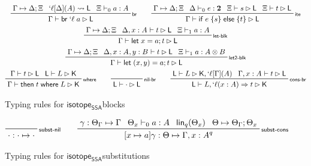 \documentclass[acmsmall,screen,review]{acmart}
\newcommand{\mb}[1]{\ensuremath{\mathbf{#1}}}
\newcommand{\ms}[1]{\ensuremath{\mathsf{#1}}}
\newcommand{\lbl}[1]{{`#1}}
\newcommand{\lto}{\Rightarrow}
\newcommand{\letstmt}[3]{\ensuremath{\ms{let}\;#1 = #2; #3}}
\newcommand{\brb}[2]{\ms{br}\;#1\;#2}
\newcommand{\lbrb}[2]{\brb{\lbl{#1}}{#2}}
\newcommand{\ite}[3]{\ms{if}\;#1\;\{#2\}\;\ms{else}\;\{#3\}}
\newcommand{\ewhere}[2]{\ms{then}\;#1\;\ms{where}\;#2}
\newcommand{\wbranch}[3]{#1(#2) \lto #3}
\newcommand{\lwbranch}[3]{\wbranch{\lbl{#1}}{#2}{#3}}
\newcommand{\csplits}[3]{#1 \mapsto #2;#3}
\newcommand{\lwk}[2]{#1 \rightsquigarrow #2}
\newcommand{\tlin}[2]{\ms{lin}_{#2}(#1)}
\newcommand{\thyp}[3]{#1: {#2}^{#3}}
\newcommand{\lhyp}[3]{#1[#2](#3)}
\newcommand{\llhyp}[3]{\lhyp{\lbl{#1}}{#2}{#3}}
\newcommand{\rle}[1]{{\scriptsize\textsf{#1}}}
\newcommand{\hasty}[4]{#1 \vdash_{#2} #3: #4}
\newcommand{\haslb}[3]{#1 \vdash #2 \rhd #3}
\newcommand{\lhaslb}[3]{#1 \vdash #2 \rhd #3}
\newcommand{\issubst}[3]{#1: #2 \mapsto #3}
\newcommand{\substcons}[3]{[{#2 \mapsto #3}]{#1}}
\newcommand{\isotopessa}{\ms{isotope_{SSA}}}
\begin{document}
\begin{figure}
  \begin{gather*}    
    \prftree[r]{\rle{br}}
      {\csplits{\Gamma}{\Delta}{\Xi}}
      {\lwk{\llhyp{\ell}{\Delta}{A}}{\ms{L}}}
      {\hasty{\Xi}{0}{a}{A}}
      {\haslb{\Gamma}{\lbrb{\ell}{a}}{\ms{L}}} \qquad
    \prftree[r]{\rle{ite}}
      {\csplits{\Gamma}{\Delta}{\Xi}}
      {\hasty{\Delta}{0}{e}{\mb{2}}}
      {\haslb{\Xi}{s}{\ms{L}}}
      {\haslb{\Xi}{t}{\ms{L}}}
      {\haslb{\Gamma}{\ite{e}{s}{t}}{\ms{L}}} \\
    \prftree[r]{\rle{let-blk}}
      {\csplits{\Gamma}{\Delta}{\Xi}}
      {\haslb{\Delta, \thyp{x}{A}{}}{t}{\ms{L}}}
      {\hasty{\Xi}{1}{a}{A}}
      {\haslb{\Gamma}{\letstmt{x}{a}{t}}{\ms{L}}} \\
    \prftree[r]{\rle{let2-blk}}
      {\csplits{\Gamma}{\Delta}{\Xi}}
      {\haslb{\Delta, \thyp{x}{A}{}, \thyp{y}{B}{}}{t}{\ms{L}}}
      {\hasty{\Xi}{1}{a}{A \otimes B}}
      {\haslb{\Gamma}{\letstmt{(x, y)}{a}{t}}{\ms{L}}} \\
    \prftree[r]{\rle{where}}
      {\haslb{\Gamma}{t}{\ms{L}}}
      {\lhaslb{\ms{L}}{L}{\ms{K}}}
      {\haslb{\Gamma}{\ewhere{t}{L}}{\ms{K}}} \qquad
    \prftree[r]{\rle{nil-br}}
      {\lhaslb{\ms{L}}{\cdot}{\ms{L}}} \qquad
    \prftree[r]{\rle{cons-br}}
      {\lhaslb{\ms{L}}{L}{\ms{K}, \llhyp{\ell}{\Gamma}{A}}}
      {\haslb{\Gamma, \thyp{x}{A}{}}{t}{\ms{L}}}
      {\lhaslb{\ms{L}}{L, \lwbranch{\ell}{x: A}{t}}{\ms{K}}}
  \end{gather*}
  \caption{Typing rules for \isotopessa blocks}
  \label{fig:ssa-block-typing}
\end{figure}

\begin{figure}
  \begin{gather*}
    \prftree[r]{\rle{subst-nil}}
      {\issubst{\cdot}{\cdot}{\cdot}}
      \qquad
    \prftree[r]{\rle{subst-cons}}
      {\issubst{\gamma}{\Theta_\Gamma}{\Gamma}}
      {\hasty{\Theta_x}{0}{a}{A}}
      {\tlin{\Theta_x}{q}}
      {\csplits{\Theta}{\Theta_\Gamma}{\Theta_x}}
      {\issubst{\substcons{\gamma}{x}{a}}{\Theta}{\Gamma, \thyp{x}{A}{q}}}
  \end{gather*}
  \caption{Typing rules for \isotopessa substitutions}
  \label{fig:ssa-subst-typing}
\end{figure}
\end{document}
